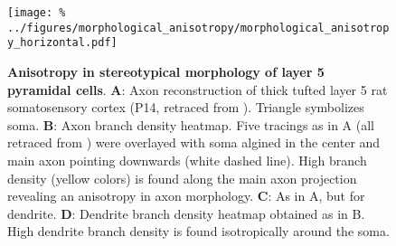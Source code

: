 \begin{figure}[h]
  \centering
  \texttt{[image: \%
    ../figures/morphological\_anisotropy/morphological\_anisotropy\_horizontal.pdf]} %
  \vspace{0.12cm}
  \caption{\textbf{Anisotropy in stereotypical morphology of layer 5
      pyramidal cells}. \textbf{A}: Axon reconstruction of thick
    tufted layer 5 rat somatosensory cortex (P14, retraced from
    \textcite{Romand2011}). Triangle symbolizes soma. \textbf{B}: Axon
    branch density heatmap. Five tracings as in A (all retraced from
    \cite{Romand2011}) were overlayed with soma algined in the center
    and main axon pointing downwards (white dashed line). High branch
    density (yellow colors) is found along the main axon projection
    revealing an anisotropy in axon morphology. \textbf{C}: As in A,
    but for dendrite. \textbf{D}: Dendrite branch density heatmap
    obtained as in B. High dendrite branch density is found
    isotropically around the soma.}
  \label{fig:aniso_morph}
\end{figure}

